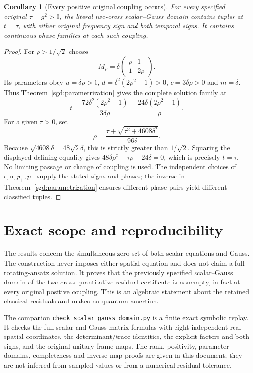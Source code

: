 \documentclass[11pt]{article}
\newtheorem{corollary}{Corollary}
\begin{document}
\begin{corollary}[Every positive original coupling occurs]
\label{sgd:every-coupling}
For every specified original $\tau=g^2>0$, the literal two-cross
scalar--Gauss domain contains tuples at $t=\tau$, with either original
frequency sign and both temporal signs. It contains continuous phase
families at each such coupling.
\end{corollary}
\begin{proof}
For $\rho>1/\sqrt2$ choose
\[
 M_\rho=\delta\begin{pmatrix}\rho&1\\1&2\rho\end{pmatrix}.
\]
Its parameters obey $u=\delta\rho>0$,
$d=\delta^2(2\rho^2-1)>0$, $c=3\delta\rho>0$ and $m=\delta$.
Thus Theorem~\ref{sgd:parametrization} gives the complete solution
family at
\[
 t=\frac{72\delta^2(2\rho^2-1)}{3\delta\rho}
   =\frac{24\delta(2\rho^2-1)}\rho.
\]
For a given $\tau>0$, set
\[
 \rho=\frac{\tau+\sqrt{\tau^2+4608\delta^2}}{96\delta}.
\]
Because $\sqrt{4608}\delta=48\sqrt2\delta$, this is strictly
greater than $1/\sqrt2$. Squaring the displayed defining equality
gives $48\delta\rho^2-\tau\rho-24\delta=0$, which is precisely
$t=\tau$. No limiting passage or change of coupling is used.
The independent choices of $\epsilon,\sigma,p_+,p_-$ supply the
stated signs and phases; the inverse in Theorem~\ref{sgd:parametrization}
ensures different phase pairs yield different classified tuples.
\end{proof}

\section{Exact scope and reproducibility}

The results concern the simultaneous zero set of both scalar equations
and Gauss. The construction never imposes either spatial equation and
does not claim a full rotating-ansatz solution. It proves that the
previously specified scalar--Gauss domain of the two-cross quantitative
residual certificate is nonempty, in fact at every original positive
coupling. This is an algebraic statement about the retained classical
residuals and makes no quantum assertion.

The companion \texttt{check\_scalar\_gauss\_domain.py} is a finite exact
symbolic replay. It checks the full scalar and Gauss matrix formulas with
eight independent real spatial coordinates, the determinant/trace
identities, the explicit factors and both signs, and the original
unitary frame maps. The rank, positivity, parameter domains, completeness
and inverse-map proofs are given in this document; they are not inferred
from sampled values or from a numerical residual tolerance.
\end{document}
